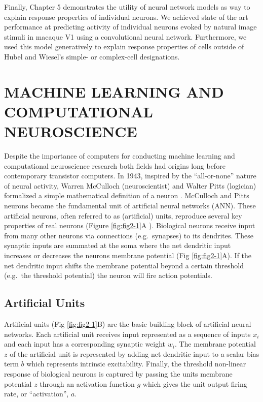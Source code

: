 \documentclass{templates/ucdenverthesis}
\begin{document}
Finally, Chapter 5 demonstrates the utility of neural network models as way to explain response properties of individual neurons. We achieved state of the art performance at predicting activity of individual neurons evoked by natural image stimuli in macaque V1 using a convolutional neural network. Furthermore, we used this model generatively to explain response properties of cells outside of Hubel and Wiesel's simple- or complex-cell designations.

\hypertarget{ch:mlprimer}{%
\chapter{MACHINE LEARNING AND COMPUTATIONAL NEUROSCIENCE}\label{ch:mlprimer}}

Despite the importance of computers for conducting machine learning and computational neuroscience research both fields had origins long before contemporary transistor computers. In 1943, inspired by the ``all-or-none'' nature of neural activity, Warren McCulloch (neuroscientist) and Walter Pitts (logician) formalized a simple mathematical definition of a neuron \autocite{McCulloch:1943vq}.
McCulloch and Pitts neurons became the fundamental unit of artificial neural networks (ANN). These artificial neurons, often referred to as (artificial) units, reproduce several key properties of real neurons (Figure \ref{fig:fig2-1}A ). Biological neurons receive input from many other neurons via connections (e.g.~synapses) to its dendrites. These synaptic inputs are summated at the soma where the net dendritic input increases or decreases the neurons membrane potential (Fig \ref{fig:fig2-1}A). If the net dendritic input shifts the membrane potential beyond a certain threshold (e.g.~the threshold potential) the neuron will fire action potentials.

\hypertarget{sec:artificialunits}{%
\section{Artificial Units}\label{sec:artificialunits}}

Artificial units (Fig \ref{fig:fig2-1}B) are the basic building block of artificial neural networks. Each artificial unit receives input represented as a sequence of inputs \(x_i\) and each input has a corresponding synaptic weight \(w_i\). The membrane potential \(z\) of the artificial unit is represented by adding net dendritic input to a scalar bias term \(b\) which represents intrinsic excitability. Finally, the threshold non-linear response of biological neurons is captured by passing the units membrane potential \(z\) through an activation function \(g\) which gives the unit output firing rate, or ``activation'', \(a\).
\end{document}
